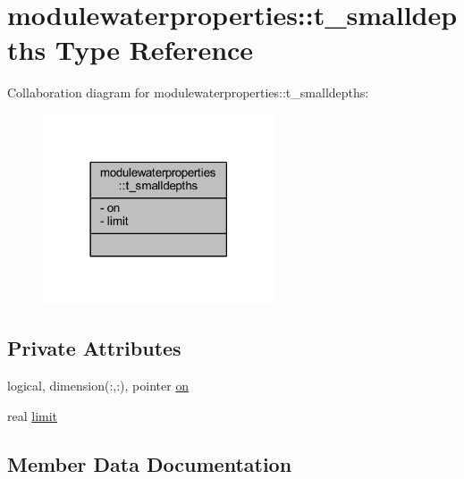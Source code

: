 \hypertarget{structmodulewaterproperties_1_1t__smalldepths}{}\section{modulewaterproperties\+:\+:t\+\_\+smalldepths Type Reference}
\label{structmodulewaterproperties_1_1t__smalldepths}


Collaboration diagram for modulewaterproperties\+:\+:t\+\_\+smalldepths\+:\nopagebreak
\begin{figure}[H]
\begin{center}
\leavevmode
\includegraphics[width=194pt]{structmodulewaterproperties_1_1t__smalldepths__coll__graph}
\end{center}
\end{figure}
\subsection*{Private Attributes}
\begin{DoxyCompactItemize}
\item 
logical, dimension(\+:,\+:), pointer \mbox{\hyperlink{structmodulewaterproperties_1_1t__smalldepths_abcc492ca3e66dfc49927a1b5add7eb87}{on}}
\item 
real \mbox{\hyperlink{structmodulewaterproperties_1_1t__smalldepths_aad42e2b08a8354b0e0fa3e1c5a95f65c}{limit}}
\end{DoxyCompactItemize}


\subsection{Member Data Documentation}
\mbox{\label{structmodulewaterproperties_1_1t__smalldepths_aad42e2b08a8354b0e0fa3e1c5a95f65c}} 
